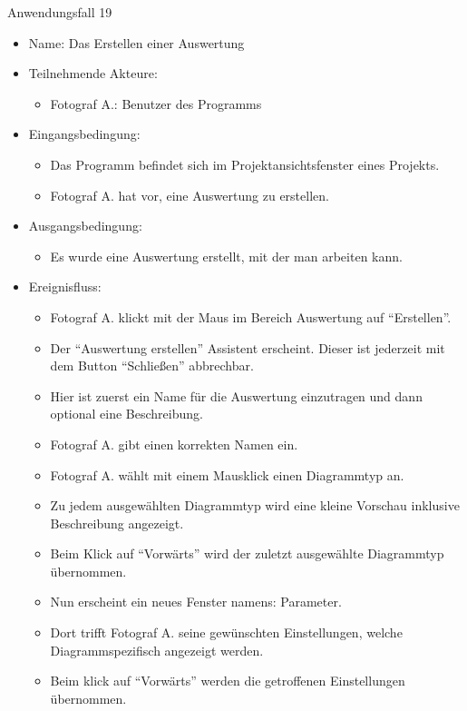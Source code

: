 \begin{description}
\item[Anwendungsfall 19]
\end{description}
 
\begin{itemize}
\item Name: Das Erstellen einer Auswertung
\item Teilnehmende Akteure:
\begin{itemize}
\item Fotograf A.: Benutzer des Programms
\end{itemize}
\item Eingangsbedingung:
\begin{itemize}
\item Das Programm befindet sich im Projektansichtsfenster eines Projekts.
\item Fotograf A. hat vor, eine Auswertung zu erstellen.
\end{itemize}
\item Ausgangsbedingung:
\begin{itemize}
\item Es wurde eine Auswertung erstellt, mit der man arbeiten kann.
\end{itemize}
\item Ereignisfluss:
\begin{itemize}
\item Fotograf A. klickt mit der Maus im Bereich Auswertung auf "`Erstellen"'.
\item Der "`Auswertung erstellen"' Assistent erscheint. Dieser ist jederzeit mit dem Button "`Schließen"' abbrechbar.
\item Hier ist zuerst ein Name für die Auswertung einzutragen und dann optional eine Beschreibung.
\item Fotograf A. gibt einen korrekten Namen ein.
\item Fotograf A. wählt mit einem Mausklick einen Diagrammtyp an.
\item Zu jedem ausgewählten Diagrammtyp wird eine kleine Vorschau inklusive Beschreibung angezeigt.
\item Beim Klick auf "`Vorwärts"' wird der zuletzt ausgewählte Diagrammtyp übernommen.
\item Nun erscheint ein neues Fenster namens: Parameter.
\item Dort trifft Fotograf A. seine gewünschten Einstellungen, welche Diagrammspezifisch angezeigt werden. 
\item Beim klick auf "`Vorwärts"' werden die getroffenen Einstellungen übernommen.

\end{itemize}
\end{itemize}
